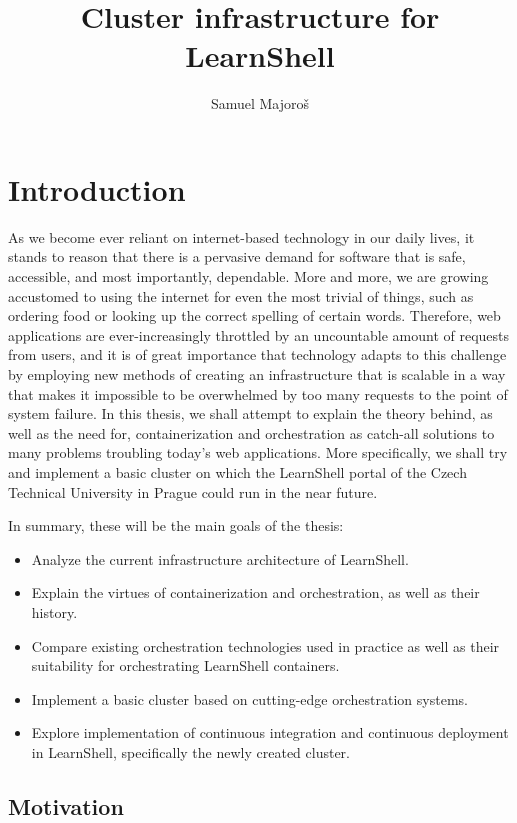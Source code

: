 \documentclass[thesis=B,english]{FITthesis}[2019/12/23]
\title{Cluster infrastructure for LearnShell}
\author{Samuel Majoroš} %
\begin{document}

\chapter{Introduction}

As we become ever reliant on internet-based technology in our daily lives, it stands to reason that there is a pervasive demand for software that is safe, accessible, and most importantly, dependable. More and more, we are growing accustomed to using the internet for even the most trivial of things, such as ordering food or looking up the correct spelling of certain words. Therefore, web applications are ever-increasingly throttled by an uncountable amount of requests from users, and it is of great importance that technology adapts to this challenge by employing new methods of creating an infrastructure that is scalable in a way that makes it impossible to be overwhelmed by too many requests to the point of system failure. In this thesis, we shall attempt to explain the theory behind, as well as the need for, containerization and orchestration as catch-all solutions to many problems troubling today's web applications. More specifically, we shall try and implement a basic cluster on which the LearnShell portal of the Czech Technical University in Prague could run in the near future. 

In summary, these will be the main goals of the thesis:
\begin{itemize}
  \setlength\itemsep{0em}
  \item Analyze the current infrastructure architecture of LearnShell.
  \item Explain the virtues of containerization and orchestration, as well as their history.
  \item Compare existing orchestration technologies used in practice as well as their suitability for orchestrating LearnShell containers.
  \item Implement a basic cluster based on cutting-edge orchestration systems.
  \item Explore implementation of continuous integration and continuous deployment in LearnShell, specifically the newly created cluster.
\end{itemize}

\section{Motivation}
\end{document}
